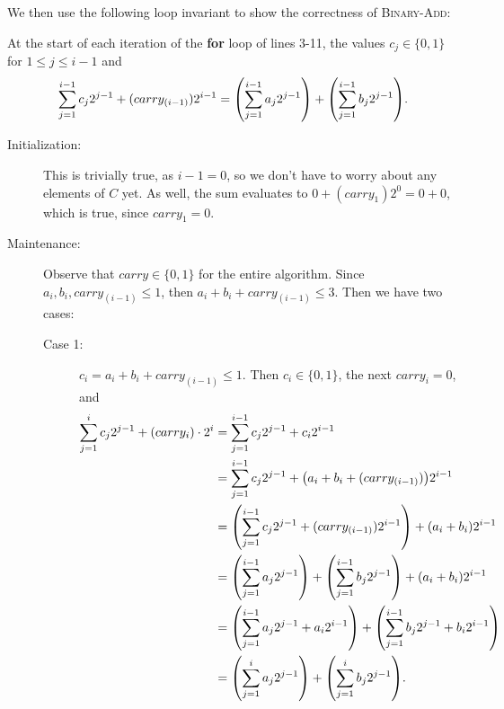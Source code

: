 \documentclass[Chapter02]{subfiles}
\begin{document}
\begin{enumerate}
\begin{answer}
			We then use the following loop invariant to show the correctness of \textsc{Binary-Add}:

			\begin{addmargin}[2em]{2em}
				At the start of each iteration of the \textbf{for} loop of lines 3-11, the values $c_j \in \{0,1\}$ for $1 \leq j \leq i - 1$ and
				\[
					\sum_{j = 1}^{i - 1} c_j2^{j - 1} + (carry_{(i - 1)})2^{i-1} = \qty(\sum_{j = 1}^{i - 1} a_j 2^{j - 1}) + \qty(\sum_{j = 1}^{i - 1} b_j 2^{j - 1}).
				\]
			\end{addmargin}

			\begin{description}
				\item[Initialization:] This is trivially true, as $i - 1 = 0$, so we don't have to worry about any elements of $C$ yet. As well, the sum evaluates to $0 + (carry_1)2^0 = 0 + 0$, which is true, since $carry_1 = 0$.

				\item[Maintenance:] Observe that $carry \in \{0,1\}$ for the entire algorithm. Since $a_i, b_i, carry_{(i - 1)} \leq 1$, then $a_i + b_i + carry_{(i - 1)} \leq 3$. Then we have two cases:
				\begin{description}
					\item[Case 1:] $c_i = a_i + b_i + carry_{(i - 1)} \leq 1$. Then $c_i \in \{0, 1\}$, the next $carry_i = 0$, and
					\begin{align*}
						\sum_{j = 1}^{i} c_j2^{j - 1} + (carry_i) \cdot 2^{i} &= \sum_{j = 1}^{i - 1} c_j2^{j - 1} + c_i2^{i - 1}\\
							&= \sum_{j = 1}^{i - 1} c_j2^{j - 1} + \qty(a_i + b_i + (carry_{(i - 1)}))2^{i - 1}\\
							&= \qty(\sum_{j = 1}^{i - 1} c_j2^{j - 1} + (carry_{(i - 1)})2^{i - 1}) + (a_i + b_i)2^{i - 1}\\
							&= \qty(\sum_{j = 1}^{i - 1} a_j 2^{j - 1}) + \qty(\sum_{j = 1}^{i - 1} b_j 2^{j - 1}) + (a_i + b_i)2^{i - 1}\\
							&= \qty(\sum_{j = 1}^{i - 1} a_j 2^{j - 1} + a_i2^{i - 1}) + \qty(\sum_{j = 1}^{i - 1} b_j 2^{j - 1} + b_i2^{i-1})\\
							&= \qty(\sum_{j = 1}^i a_j 2^{j - 1}) + \qty(\sum_{j = 1}^i b_j 2^{j - 1}).
					\end{align*}


\end{description}
\end{description}
\end{answer}
\end{enumerate}
\end{document}

